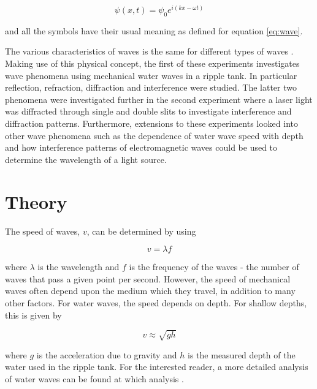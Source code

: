 \documentclass{article}
\begin{document}
\begin{equation}
\label{eq:complex-wave}
\psi(x, t) = \psi_0 e^{i(kx - \omega t)}
\end{equation}

\vspace{2mm}
\noindent
and all the symbols have their usual meaning as defined for equation \eqref{eq:wave}.

\vspace{2mm}
\noindent
The various characteristics of waves is the same for different types of waves \cite{Paper01}. Making use of this physical concept, the first of these experiments investigates wave phenomena using mechanical water waves in a ripple tank. In particular reflection, refraction, diffraction and interference were studied. The latter two phenomena were investigated further in the second experiment where a laser light was diffracted through single and double slits to investigate interference and diffraction patterns. Furthermore, extensions to these experiments looked into other wave phenomena such as the dependence of water wave speed with  depth and how interference patterns of electromagnetic waves could be used to determine the wavelength of a light source.


\section{Theory}
\label{sec:theory}

The speed of waves, $v$, can be determined by using 

\begin{equation}
\label{eq:wave-speed}
v = \lambda f
\end{equation}

\vspace{2mm}
\noindent
where $\lambda$ is the wavelength and $f$ is the frequency of the waves - the number of waves that pass a given point per second. However, the speed of mechanical waves often depend upon the medium which they travel, in addition to many other factors. For water waves, the speed depends on depth. For shallow depths, this is given by \cite{Book02}

\begin{equation}
\label{eq:water-waves}
v \approx \sqrt{gh}
\end{equation}

\vspace{2mm}
\noindent
where $g$ is the acceleration due to gravity and $h$ is the measured depth of the water used in the ripple tank. For the interested reader, a more detailed analysis of water waves can be found at which analysis \cite{Book02}. 
\end{document}
